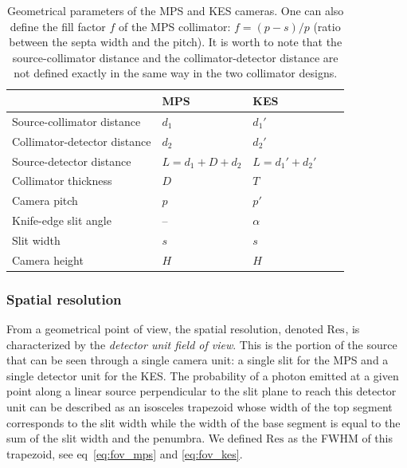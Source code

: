\documentclass[a4paper,english,12pt]{article}
\begin{document}
\begin{table}[h]
\centering
\begin{tabular}{lllll}
	\midrule
																& MPS               & KES \\
	\midrule
	Source-collimator distance		& $d_1$             & $d_1'$ \\
 	Collimator-detector distance	& $d_2$             & $d_2'$ \\
	Source-detector distance			& $L=d_1+D+d_2$			& $L=d_1'+d_2'$\\
 	Collimator thickness 					& $D$               & $T$ \\
	Camera pitch									& $p$								& $p'$\\
	Knife-edge slit angle					& --								& $\alpha$\\	
	Slit width										& $s$ 							& $s$ \\ %
	Camera height									& $H$ 							& $H$ \\	
	\midrule
\end{tabular}
\caption{Geometrical parameters of the MPS and KES cameras. One can also define the fill factor $f$ of the MPS collimator: $f=(p-s)/p$ (ratio between the septa width and the pitch). It is worth to note that the source-collimator distance and the collimator-detector distance are not defined exactly in the same way in the two collimator designs.}
\label{table:CamerasParameters}
\end{table}



\subsubsection{Spatial resolution}

\newcommand\FOV{\textrm{Res}}
\newcommand\MPS{\textrm{MPS}}
\newcommand\KES{\textrm{KES}}
\newcommand\du{}
\newcommand\DE{\textrm{Eff}}

From a geometrical point of view, the spatial resolution, denoted $\FOV_{\du}$, is characterized by the \textit{detector unit field of view}. This is the portion of
the source that can be seen through a single camera unit: a single slit for the MPS and a single detector unit for the KES. The probability of a photon emitted at a
given point along a linear source perpendicular to the slit plane to reach
this detector unit can be described as an isosceles trapezoid whose width of the top segment corresponds to the slit width while the width of the base segment is equal to the sum of the slit width and the penumbra. We defined $\FOV_{\du}$
as the FWHM of this trapezoid, see eq~\ref{eq:fov_mps} and \ref{eq:fov_kes}.
\end{document}
